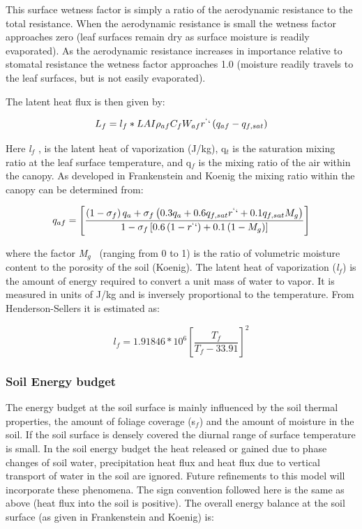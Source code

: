 This surface wetness factor is simply a ratio of the aerodynamic resistance to the total resistance. When the aerodynamic resistance is small the wetness factor approaches zero (leaf surfaces remain dry as surface moisture is readily evaporated). As the aerodynamic resistance increases in importance relative to stomatal resistance the wetness factor approaches 1.0 (moisture readily travels to the leaf surfaces, but is not easily evaporated).

The latent heat flux is then given by:

\begin{equation}
{L_f} = {l_f} * LAI{\rho_{af}}{C_f}{W_{af}}{r^``}\left( {{q_{af}} - {q_{f,sat}}} \right)
\end{equation}

Here \emph{l\(_{f}\)} , is the latent heat of vaporization (J/kg), q\(_{t}\) is the saturation mixing ratio at the leaf surface temperature, and q\(_{f}\) is the mixing ratio of the air within the canopy. As developed in Frankenstein and Koenig the mixing ratio within the canopy can be determined from:

\begin{equation}
{q_{af}} = \left[ {\frac{{\left( {1 - {\sigma_f}} \right){q_a} + {\sigma_f}\left( {0.3{q_a} + 0.6{q_{f,sat}}{r^``} + 0.1{q_{f,sat}}{M_g}} \right)}}{{1 - {\sigma_f}\left[ {0.6\left( {1 - {r^``}} \right) + 0.1\left( {1 - {M_g}} \right)} \right]}}} \right]
\end{equation}

where the factor \emph{M\(_{g}\)} ~(ranging from 0 to 1) is the ratio of volumetric moisture content to the porosity of the soil (Koenig). The latent heat of vaporization (\emph{l\(_{f}\)}) is the amount of energy required to convert a unit mass of water to vapor. It is measured in units of J/kg and is inversely proportional to the temperature. From Henderson-Sellers it is estimated as:

\begin{equation}
{l_f} = 1.91846*{10^6}{\left[ {\frac{{{T_f}}}{{{T_f} - 33.91}}} \right]^2}
\end{equation}

\subsubsection{Soil Energy budget}\label{soil-energy-budget}

The energy budget at the soil surface is mainly influenced by the soil thermal properties, the amount of foliage coverage (s\(_{f}\)) and the amount of moisture in the soil. If the soil surface is densely covered the diurnal range of surface temperature is small. In the soil energy budget the heat released or gained due to phase changes of soil water, precipitation heat flux and heat flux due to vertical transport of water in the soil are ignored. Future refinements to this model will incorporate these phenomena. The sign convention followed here is the same as above (heat flux into the soil is positive). The overall energy balance at the soil surface (as given in Frankenstein and Koenig) is:


